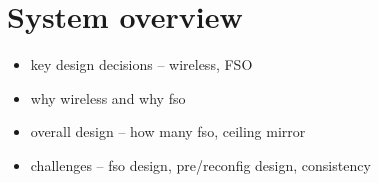 \section{\Name System overview}


\begin{itemize}

\item key design decisions -- wireless, FSO

\item why wireless and why fso 

\item overall design -- how many fso, ceiling mirror 

\item challenges  -- fso design, pre/reconfig design, consistency  

\end{itemize}

